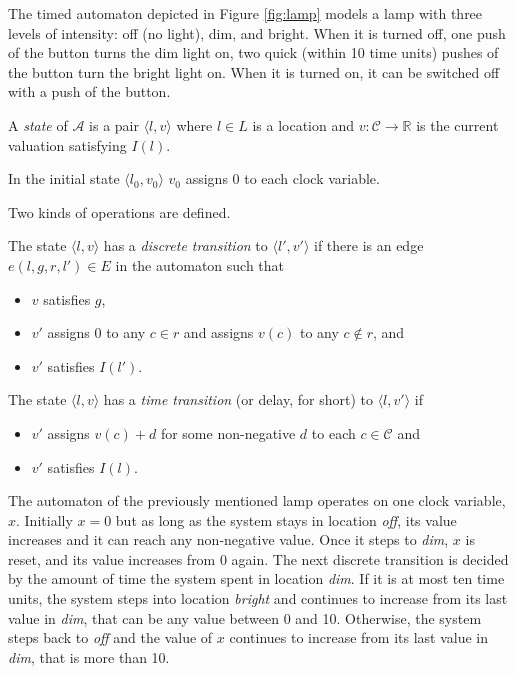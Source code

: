\begin{example}
	The timed automaton depicted in Figure \ref{fig:lamp} models a lamp with three levels of intensity: off (no light), dim, and bright. When it is turned off, one push of the button turns the dim light on, two quick (within 10 time units) pushes of the button turn the bright light on. When it is turned on, it can be switched off with a push of the button.
\end{example}

\begin{dfn}
	A \emph{state} of $\mathcal{A}$ is a pair $\langle l,v \rangle$ where $l \in L$ is a
	location and $v:\mathcal{C} \to \mathds{R}$ is the current valuation satisfying $I(l)$.
\end{dfn}
 In the initial state $\langle l_0,v_0 \rangle$ $v_0$ assigns 0 to each clock variable.

Two kinds of operations are defined.

\begin{dfn}
	 The state $\langle l,v \rangle$ has a
	 \emph{discrete transition} to $\langle l',v' \rangle$  if there is an
	 edge $e(l,g,r,l') \in E$ in the automaton such that 
	 \begin{itemize}
	 	\item $v$ satisfies $g$, 
	 	\item $v'$ assigns 0 to any $c \in r$ and assigns $v(c)$ to any $c \not\in r$, and
	 	\item $v'$ satisfies $I(l')$. 
	 \end{itemize}
\end{dfn}

\begin{dfn}
The state $\langle l,v \rangle$ has a \emph{time transition} (or delay, for short) to $\langle l,v' \rangle$ if
\begin{itemize}
	\item $v'$ assigns $v(c)+d$ for some non-negative $d$ to each $c \in \mathcal{C}$ and
	\item $v'$ satisfies $I(l)$. 
\end{itemize}
\end{dfn}

\begin{example}
	The automaton of the previously mentioned lamp operates on one clock variable, $x$. Initially $x=0$ but as long as the system stays in location \emph{off}, its value increases and it can reach any non-negative value. Once it steps to \emph{dim}, $x$ is reset, and its value increases from 0 again. The next discrete transition is decided by the amount of time the system spent in location \emph{dim}. If it is at most ten time units, the system steps into location \emph{bright} and continues to increase from its last value in \emph{dim}, that can be any value between 0 and 10. Otherwise, the system steps back to \emph{off} and the value of $x$ continues to increase from its last value in \emph{dim}, that is more than 10.
\end{example}

